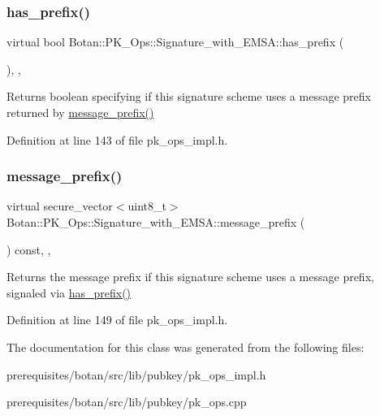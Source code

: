 \subsubsection{\texorpdfstring{has\+\_\+prefix()}{has\_prefix()}}
{\footnotesize\ttfamily virtual bool Botan\+::\+P\+K\+\_\+\+Ops\+::\+Signature\+\_\+with\+\_\+\+E\+M\+S\+A\+::has\+\_\+prefix (\begin{DoxyParamCaption}{ }\end{DoxyParamCaption})\hspace{0.3cm}{\ttfamily [inline]}, {\ttfamily [protected]}, {\ttfamily [virtual]}}

\begin{DoxyReturn}{Returns}
boolean specifying if this signature scheme uses a message prefix returned by \mbox{\hyperlink{class_botan_1_1_p_k___ops_1_1_signature__with___e_m_s_a_a244a2198ae06eee87af2e273d8ca8882}{message\+\_\+prefix()}} 
\end{DoxyReturn}


Definition at line 143 of file pk\+\_\+ops\+\_\+impl.\+h.

\mbox{\label{class_botan_1_1_p_k___ops_1_1_signature__with___e_m_s_a_a244a2198ae06eee87af2e273d8ca8882}} 
\subsubsection{\texorpdfstring{message\+\_\+prefix()}{message\_prefix()}}
{\footnotesize\ttfamily virtual secure\+\_\+vector$<$uint8\+\_\+t$>$ Botan\+::\+P\+K\+\_\+\+Ops\+::\+Signature\+\_\+with\+\_\+\+E\+M\+S\+A\+::message\+\_\+prefix (\begin{DoxyParamCaption}{ }\end{DoxyParamCaption}) const\hspace{0.3cm}{\ttfamily [inline]}, {\ttfamily [protected]}, {\ttfamily [virtual]}}

\begin{DoxyReturn}{Returns}
the message prefix if this signature scheme uses a message prefix, signaled via \mbox{\hyperlink{class_botan_1_1_p_k___ops_1_1_signature__with___e_m_s_a_ab4da61a06cf9709d9f240b445142481b}{has\+\_\+prefix()}} 
\end{DoxyReturn}


Definition at line 149 of file pk\+\_\+ops\+\_\+impl.\+h.



The documentation for this class was generated from the following files\+:\begin{DoxyCompactItemize}
\item 
prerequisites/botan/src/lib/pubkey/pk\+\_\+ops\+\_\+impl.\+h\item 
prerequisites/botan/src/lib/pubkey/pk\+\_\+ops.\+cpp\end{DoxyCompactItemize}
